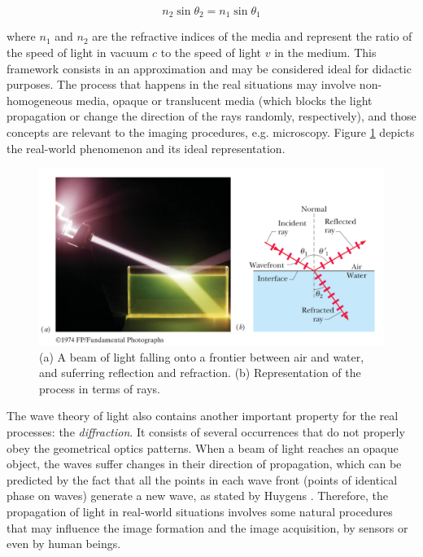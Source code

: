\begin{equation}
    \label{eqn:snells_law}
       n_{2}\sin{\theta_{2}} = n_{1}\sin{\theta_{1}}
\end{equation}

\noindent where $\mathit{n_{1}}$ and $\mathit{n_{2}}$ are the refractive indices of the media and represent the ratio of the speed of light in vacuum $\mathit{c}$ to the speed of light $\mathit{v}$ in the medium.
This framework consists in an approximation and may be considered ideal for didactic purposes. The process that happens in the real situations may involve non-homogeneous media, opaque or translucent media (which blocks the light propagation or change the direction of the rays randomly, respectively), and those concepts are relevant to the imaging procedures, e.g. microscopy. Figure \ref{fig:beam_split} depicts the real-world phenomenon and its ideal representation.

\begin{figure}[htb]
	\centering
	\caption{\label{fig:beam_split} 
	    (a) A beam of light falling onto a frontier between air and water, and suferring reflection and refraction. (b) Representation of the process in terms of rays.}
	\begin{center}
	    \includegraphics[scale=0.3]{images/fig3.png}
	\end{center}
	\centering
\end{figure}

The wave theory of light also contains another important property for the real processes: the \emph{diffraction}. It consists of several occurrences that do not properly obey the geometrical optics patterns. When a beam of light reaches an opaque object, the waves suffer changes in their direction of propagation, which can be predicted by the fact that all the points in each wave front (points of identical phase on waves) generate a new wave, as stated by Huygens \cite{fowles1989introduction}. Therefore, the propagation of light in real-world situations involves some natural procedures that may influence the image formation and the image acquisition, by sensors or even by human beings.

